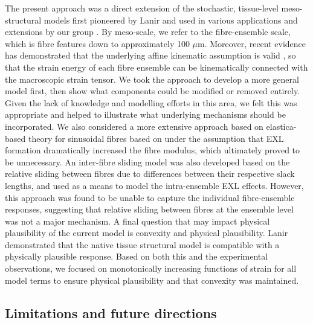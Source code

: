     The present approach was a direct extension of the stochastic, tissue-level meso-structural models first pioneered by Lanir \cite{lanir_constitutive_1983} and used in various applications and extensions by our group \cite{sacks_incorporation_2003,fata_insights_2014,zhang_meso_2016}. By meso-scale, we refer to the fibre-ensemble scale, which is fibre features down to approximately 100 $\mu$m. Moreover, recent evidence has demonstrated that the underlying affine kinematic assumption is valid \cite{fata_insights_2014,fan_simulation_2014}, so that the strain energy of each fibre ensemble can be kinematically connected with the macroscopic strain tensor. We took the approach to develop a more general model first, then show what components could be modified or removed entirely. Given the lack of knowledge and modelling efforts in this area, we felt this was appropriate and helped to illustrate what underlying mechanisms should be incorporated. We also considered a more extensive approach based on elastica-based theory for sinusoidal fibres based on \cite{garikipati_elastica_2008} under the assumption that EXL formation dramatically increased the fibre modulus, which ultimately proved to be unnecessary. An inter-fibre sliding model was also developed based on the relative sliding between fibres due to differences between their respective slack lengths, and used as a means to model the intra-ensemble EXL effects. However, this approach was found to be unable to capture the individual fibre-ensemble responses, suggesting that relative sliding between fibres at the ensemble level was not a major mechanism. A final question that may impact physical plausibility of the current model is convexity and physical plausibility. Lanir \cite{lanir_plausibility_1994} demonstrated that the native tissue structural model is compatible with a physically plausible response. Based on both this and the experimental observations, we focused on monotonically increasing functions of strain for all model terms to ensure physical plausibility and that convexity was maintained.
    



\subsection{Limitations and future directions}

